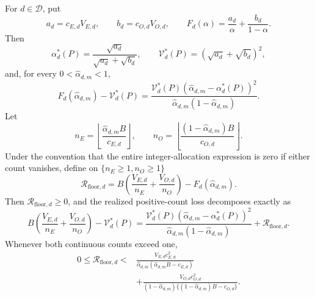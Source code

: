 For \(d\in\mathcal D\), put
\[
 a_d=c_{E,d}V_{E,d},\qquad b_d=c_{O,d}V_{O,d},
 \qquad
 F_d(\alpha)=\frac{a_d}{\alpha}+\frac{b_d}{1-\alpha}.
\]
Then
\[
 \alpha_d^*(P)=\frac{\sqrt{a_d}}{\sqrt{a_d}+\sqrt{b_d}},
 \qquad
 \mathcal V_d^*(P)=(\sqrt{a_d}+\sqrt{b_d})^2,
\]
and, for every \(0<\widehat\alpha_{d,m}<1\),
\[
 F_d(\widehat\alpha_{d,m})-\mathcal V_d^*(P)
 =\frac{\mathcal V_d^*(P)
 (\widehat\alpha_{d,m}-\alpha_d^*(P))^2}
 {\widehat\alpha_{d,m}(1-\widehat\alpha_{d,m})}.       \tag{1}
\]
Let
\[
 n_E=\left\lfloor\frac{\widehat\alpha_{d,m}B}{c_{E,d}}\right\rfloor,
 \qquad
 n_O=\left\lfloor\frac{(1-\widehat\alpha_{d,m})B}{c_{O,d}}\right\rfloor.
\]
Under the convention that the entire integer-allocation expression is zero if either count vanishes, define on \(\{n_E\ge1,n_O\ge1\}\)
\[
 \mathcal R_{\mathrm{floor},d}
 =B\left(\frac{V_{E,d}}{n_E}+\frac{V_{O,d}}{n_O}\right)
 -F_d(\widehat\alpha_{d,m}).                            \tag{2}
\]
Then \(\mathcal R_{\mathrm{floor},d}\ge0\), and the realized positive-count loss decomposes exactly as
\[
 B\left(\frac{V_{E,d}}{n_E}+\frac{V_{O,d}}{n_O}\right)
 -\mathcal V_d^*(P)
 =\frac{\mathcal V_d^*(P)
 (\widehat\alpha_{d,m}-\alpha_d^*(P))^2}
 {\widehat\alpha_{d,m}(1-\widehat\alpha_{d,m})}
 +\mathcal R_{\mathrm{floor},d}.                       \tag{3}
\]
Whenever both continuous counts exceed one,
\[
\begin{aligned}
 0\le\mathcal R_{\mathrm{floor},d}
 <{}&\frac{V_{E,d}c_{E,d}^2}
 {\widehat\alpha_{d,m}(\widehat\alpha_{d,m}B-c_{E,d})}\\
 &+\frac{V_{O,d}c_{O,d}^2}
 {(1-\widehat\alpha_{d,m})
 \{(1-\widehat\alpha_{d,m})B-c_{O,d}\}}.             \tag{4}
\end{aligned}
\]